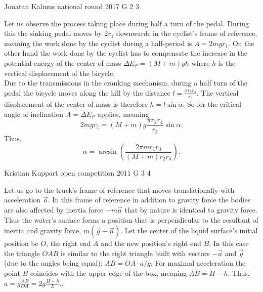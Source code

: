 \documentclass[11pt]{article}
\begin{document}
{Jonatan Kalmus} %
{national round} %
{2017} %
{G 2} %
{3} %
{

\ifEngSolution
Let us observe the process taking place during half a turn of the pedal. During this the sinking pedal moves by $2r_1$ downwards in the cyclist’s frame of reference, meaning the work done by the cyclist during a half-period is $A = 2mgr_1$. On the other hand the work done by the cyclist has to compensate the increase in the potential energy of the center of mass $\Delta E_P = (M + m)gh$ where $h$ is the vertical displacement of the bicycle.\\
Due to the transmissions in the cranking mechanism, during a half turn of the pedal the bicycle moves along the hill by the distance $l=\frac{\pi r_2 r_4}{r_3}$. The vertical displacement of the center of mass is therefore $h = l\sin\alpha$. So for the critical angle of inclination $A = \Delta E_P$ applies, meaning 
\[
2mgr_1 = (M + m)g\frac{\pi r_2r_4}{r_3}\sin\alpha.
\]
Thus, 
\[
\alpha = \arcsin\left(\frac{2\pi mr_1r_3}{(M + m)r_2r_4}\right).
\]
\fi
}

{Kristian Kuppart} %
{open competition} %
{2011} %
{G 3} %
{4} %
{

\ifEngSolution
Let us go to the truck’s frame of reference that moves translationally with acceleration $\vec a$. In this frame of reference in addition to gravity force the bodies are also affected by inertia force $-m\vec a$ that by nature is identical to gravity force. Thus the water’s surface forms a position that is perpendicular to the resultant of inertia and gravity force, $m(\vec g-\vec a)$. Let the center of the liquid surface’s initial position be $O$, the right end $A$ and the new position’s right end $B$. In this case the triangle $OAB$ is similar to the right triangle built with vectors $-\vec a$ and $\vec g$ (due to the angles being equal): $AB=OA\cdot a/g$. For maximal acceleration the point $B$ coincides with the upper edge of the box, meaning $AB=H-h$. Thus, $a=g\frac {AB}{OA}=2g\frac {H-h}{L}.$.
\fi
}
\end{document}
